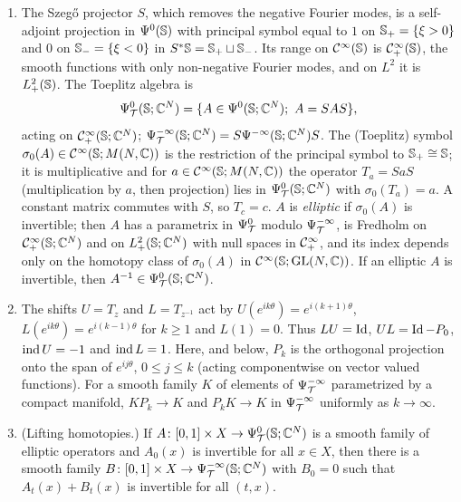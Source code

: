 \begin{enumerate}[label=(B\arabic*),leftmargin=*]
  \begin{equation*}
    \wind(b)=\frac1{2\pi i}\int_0^{2\pi}\Tr\Big(b^{-1}\frac{db}{d\theta}\Big)\,d\theta
  \end{equation*}
  is an integer, the winding number of the Fredholm determinant along $b$. For
  $b$ with values in $\GL(N,\C)$ it is the winding number of $\det b$, since
  $d\log\det b=\Tr(b^{-1}db)$. It is invariant under homotopy of loops.
\item\label{bott:B:toeplitz} The Szeg\H{o} projector $S$, which removes the negative Fourier
  modes, is a self-adjoint projection in $\Psi^{0}(\mathbb{S})$ with principal symbol
  equal to $1$ on $\mathbb{S}_+=\{\xi>0\}$ and $0$ on $\mathbb{S}_-=\{\xi<0\}$ in
  $S^*\mathbb{S}=\mathbb{S}_+\sqcup\mathbb{S}_-$. Its range on $\mathcal{C}^\infty(\mathbb{S})$ is
  $\mathcal{C}^\infty_+(\mathbb{S})$, the smooth functions with only non-negative Fourier modes,
  and on $L^2$ it is $L^2_+(\mathbb{S})$. The Toeplitz algebra is
  \begin{equation*}
    \PsiT{0}(\Sphere;\C^N)=\{A\in\Psido{0}(\Sphere;\C^N);\ A=SAS\},
  \end{equation*}
  acting on $\mathcal{C}^\infty_+(\mathbb{S};\mathbb{C}^N)$; $\Psi^{-\infty}_{\mathcal{T}}(\mathbb{S};\mathbb{C}^N)=S\Psi^{-\infty}(\mathbb{S};\mathbb{C}^N)S$.
  The (Toeplitz) symbol $\sigma_0(A)\in\mathcal{C}^\infty(\mathbb{S};M(N,\mathbb{C}))$ is the restriction of
  the principal symbol to $\mathbb{S}_+\cong\mathbb{S}$; it is multiplicative and for
  $a\in\mathcal{C}^\infty(\mathbb{S};M(N,\mathbb{C}))$ the operator $T_a=SaS$ (multiplication by $a$, then
  projection) lies in $\Psi^{0}_{\mathcal{T}}(\mathbb{S};\mathbb{C}^N)$ with $\sigma_0(T_a)=a$. A constant
  matrix commutes with $S$, so $T_c=c$. $A$ is \emph{elliptic} if $\sigma_0(A)$ is
  invertible; then $A$ has a parametrix in $\Psi^{0}_{\mathcal{T}}$ modulo $\Psi^{-\infty}_{\mathcal{T}}$, is
  Fredholm on $\mathcal{C}^\infty_+(\mathbb{S};\mathbb{C}^N)$ and on $L^2_+(\mathbb{S};\mathbb{C}^N)$ with null spaces
  in $\mathcal{C}^\infty_+$, and its index depends only on the homotopy class of $\sigma_0(A)$ in
  $\mathcal{C}^\infty(\mathbb{S};\operatorname{GL}(N,\mathbb{C}))$. If an elliptic $A$ is invertible, then
  $A^{-1}\in\Psi^{0}_{\mathcal{T}}(\mathbb{S};\mathbb{C}^N)$.
\item\label{bott:B:shifts} The shifts $U=T_{z}$ and $L=T_{z^{-1}}$ act by
  $U(e^{ik\theta})=e^{i(k+1)\theta}$, $L(e^{ik\theta})=e^{i(k-1)\theta}$ for $k\ge1$ and
  $L(1)=0$. Thus $LU=\operatorname{Id}$, $UL=\operatorname{Id}-P_0$, $\operatorname{ind} U=-1$ and $\operatorname{ind} L=1$. Here, and below,
  $P_k$ is the orthogonal projection onto the span of $e^{ij\theta}$, $0\le j\le k$
  (acting componentwise on vector valued functions). For a smooth family $K$ of
  elements of $\Psi^{-\infty}_{\mathcal{T}}$ parametrized by a compact manifold, $KP_k\to K$ and
  $P_kK\to K$ in $\Psi^{-\infty}_{\mathcal{T}}$ uniformly as $k\to\infty$.
\item\label{bott:B:lift} (Lifting homotopies.) If $A\colon[0,1]\times X\to
  \Psi^{0}_{\mathcal{T}}(\mathbb{S};\mathbb{C}^N)$ is a smooth family of elliptic operators and $A_0(x)$ is
  invertible for all $x\in X$, then there is a smooth family
  $B\colon[0,1]\times X\to\Psi^{-\infty}_{\mathcal{T}}(\mathbb{S};\mathbb{C}^N)$ with $B_0=0$ such that
  $A_t(x)+B_t(x)$ is invertible for all $(t,x)$.
\end{enumerate}

